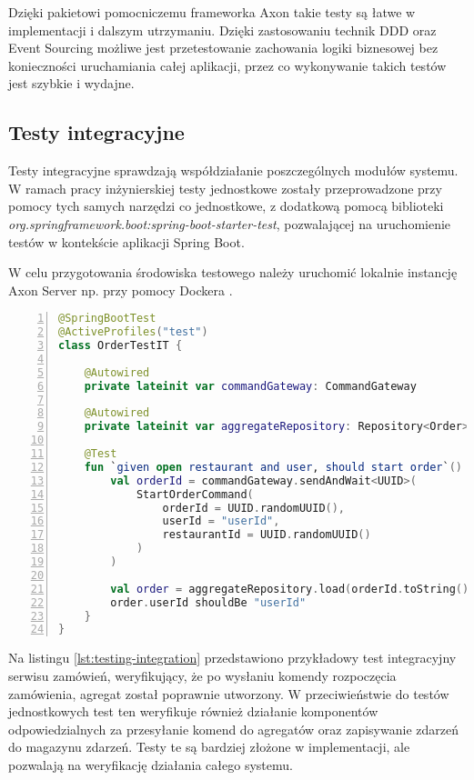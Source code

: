 Dzięki pakietowi pomocniczemu frameworka Axon takie testy są łatwe w implementacji i dalszym utrzymaniu. Dzięki zastosowaniu technik DDD oraz Event Sourcing możliwe jest przetestowanie zachowania logiki biznesowej bez konieczności uruchamiania całej aplikacji, przez co wykonywanie takich testów jest szybkie i wydajne.

\subsection{Testy integracyjne}

Testy integracyjne sprawdzają współdziałanie poszczególnych modułów systemu. W ramach pracy inżynierskiej testy jednostkowe zostały przeprowadzone przy pomocy tych samych narzędzi co jednostkowe, z dodatkową pomocą biblioteki \textit{org.springframework.boot:spring-boot-starter-test}, pozwalającej na uruchomienie testów w kontekście aplikacji Spring Boot.

W celu przygotowania środowiska testowego należy uruchomić lokalnie instancję Axon Server np. przy pomocy Dockera \cite{docker}.

\begin{lstlisting}[caption={Przykładowy test integracyjny serwisu zamówień},label={lst:testing-integration},captionpos=b,language=Kotlin,numbers=left]
@SpringBootTest
@ActiveProfiles("test")
class OrderTestIT {

    @Autowired
    private lateinit var commandGateway: CommandGateway

    @Autowired
    private lateinit var aggregateRepository: Repository<Order>

    @Test
    fun `given open restaurant and user, should start order`() {
        val orderId = commandGateway.sendAndWait<UUID>(
            StartOrderCommand(
                orderId = UUID.randomUUID(),
                userId = "userId",
                restaurantId = UUID.randomUUID()
            )
        )

        val order = aggregateRepository.load(orderId.toString())
        order.userId shouldBe "userId"
    }
}
\end{lstlisting}

Na listingu \ref{lst:testing-integration} przedstawiono przykładowy test integracyjny serwisu zamówień, weryfikujący, że po wysłaniu komendy rozpoczęcia zamówienia, agregat został poprawnie utworzony. W przeciwieństwie do testów jednostkowych test ten weryfikuje również działanie komponentów odpowiedzialnych za przesyłanie komend do agregatów oraz zapisywanie zdarzeń do magazynu zdarzeń. Testy te są bardziej złożone w implementacji, ale pozwalają na weryfikację działania całego systemu.

